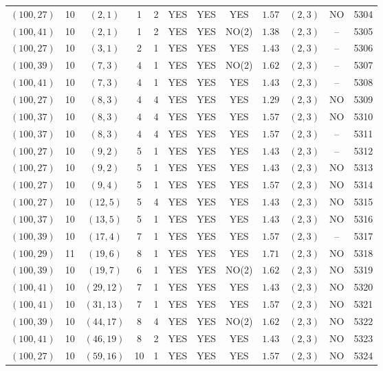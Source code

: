 \begin{longtable}{|c|c|c|c|c|c|c|c|c|c|c|c|}
$(100,27)$ & 10 & $(2,1)$ & 1 & 2 & YES & YES & YES & $1.57$ & $(2,3)$ & NO & 5304\\
$(100,41)$ & 10 & $(2,1)$ & 1 & 2 & YES & YES & NO(2) & $1.38$ & $(2,3)$ & -- & 5305\\
$(100,27)$ & 10 & $(3,1)$ & 2 & 1 & YES & YES & YES & $1.43$ & $(2,3)$ & -- & 5306\\
$(100,39)$ & 10 & $(7,3)$ & 4 & 1 & YES & YES & NO(2) & $1.62$ & $(2,3)$ & -- & 5307\\
$(100,41)$ & 10 & $(7,3)$ & 4 & 1 & YES & YES & YES & $1.43$ & $(2,3)$ & -- & 5308\\
$(100,27)$ & 10 & $(8,3)$ & 4 & 4 & YES & YES & YES & $1.29$ & $(2,3)$ & NO & 5309\\
$(100,37)$ & 10 & $(8,3)$ & 4 & 4 & YES & YES & YES & $1.57$ & $(2,3)$ & NO & 5310\\
$(100,37)$ & 10 & $(8,3)$ & 4 & 4 & YES & YES & YES & $1.57$ & $(2,3)$ & -- & 5311\\
$(100,27)$ & 10 & $(9,2)$ & 5 & 1 & YES & YES & YES & $1.43$ & $(2,3)$ & -- & 5312\\
$(100,27)$ & 10 & $(9,2)$ & 5 & 1 & YES & YES & YES & $1.43$ & $(2,3)$ & NO & 5313\\
$(100,27)$ & 10 & $(9,4)$ & 5 & 1 & YES & YES & YES & $1.57$ & $(2,3)$ & NO & 5314\\
$(100,27)$ & 10 & $(12,5)$ & 5 & 4 & YES & YES & YES & $1.43$ & $(2,3)$ & NO & 5315\\
$(100,37)$ & 10 & $(13,5)$ & 5 & 1 & YES & YES & YES & $1.43$ & $(2,3)$ & NO & 5316\\
$(100,39)$ & 10 & $(17,4)$ & 7 & 1 & YES & YES & YES & $1.57$ & $(2,3)$ & -- & 5317\\
$(100,29)$ & 11 & $(19,6)$ & 8 & 1 & YES & YES & YES & $1.71$ & $(2,3)$ & NO & 5318\\
$(100,39)$ & 10 & $(19,7)$ & 6 & 1 & YES & YES & NO(2) & $1.62$ & $(2,3)$ & NO & 5319\\
$(100,41)$ & 10 & $(29,12)$ & 7 & 1 & YES & YES & YES & $1.43$ & $(2,3)$ & NO & 5320\\
$(100,41)$ & 10 & $(31,13)$ & 7 & 1 & YES & YES & YES & $1.57$ & $(2,3)$ & NO & 5321\\
$(100,39)$ & 10 & $(44,17)$ & 8 & 4 & YES & YES & NO(2) & $1.62$ & $(2,3)$ & NO & 5322\\
$(100,41)$ & 10 & $(46,19)$ & 8 & 2 & YES & YES & YES & $1.43$ & $(2,3)$ & NO & 5323\\
$(100,27)$ & 10 & $(59,16)$ & 10 & 1 & YES & YES & YES & $1.57$ & $(2,3)$ & NO & 5324\\

\end{longtable}
